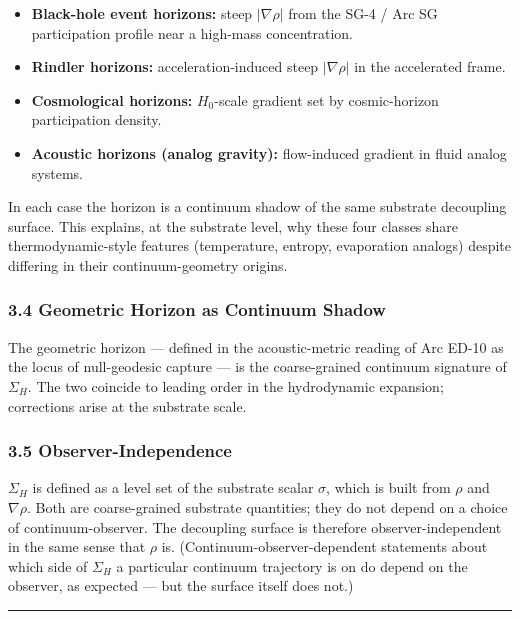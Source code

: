 \documentclass[
  11pt,
  a4paper,
]{article}
\providecommand{\tightlist}{%
  \setlength{\itemsep}{0pt}\setlength{\parskip}{0pt}}
\begin{document}
\begin{itemize}
\tightlist
\item
  \textbf{Black-hole event horizons:} steep \(|\nabla\rho|\) from the
  SG-4 / Arc SG participation profile near a high-mass concentration.
\item
  \textbf{Rindler horizons:} acceleration-induced steep \(|\nabla\rho|\)
  in the accelerated frame.
\item
  \textbf{Cosmological horizons:} \(H_0\)-scale gradient set by
  cosmic-horizon participation density.
\item
  \textbf{Acoustic horizons (analog gravity):} flow-induced gradient in
  fluid analog systems.
\end{itemize}

In each case the horizon is a continuum shadow of the same substrate
decoupling surface. This explains, at the substrate level, why these
four classes share thermodynamic-style features (temperature, entropy,
evaporation analogs) despite differing in their continuum-geometry
origins.

\subsubsection{3.4 Geometric Horizon as Continuum
Shadow}\label{geometric-horizon-as-continuum-shadow}

The geometric horizon --- defined in the acoustic-metric reading of Arc
ED-10 as the locus of null-geodesic capture --- is the coarse-grained
continuum signature of \(\Sigma_H\). The two coincide to leading order
in the hydrodynamic expansion; corrections arise at the substrate scale.

\subsubsection{3.5 Observer-Independence}\label{observer-independence}

\(\Sigma_H\) is defined as a level set of the substrate scalar
\(\sigma\), which is built from \(\rho\) and \(\nabla\rho\). Both are
coarse-grained substrate quantities; they do not depend on a choice of
continuum-observer. The decoupling surface is therefore
observer-independent in the same sense that \(\rho\) is.
(Continuum-observer-dependent statements about which side of
\(\Sigma_H\) a particular continuum trajectory is on do depend on the
observer, as expected --- but the surface itself does not.)

\begin{center}\rule{0.5\linewidth}{0.5pt}\end{center}
\end{document}
